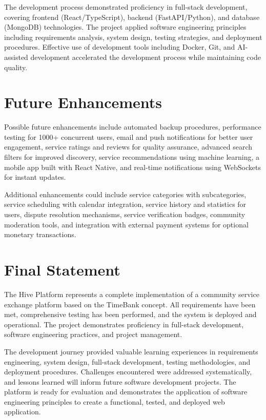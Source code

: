 \documentclass[12pt,a4paper]{report}
\begin{document}
The development process demonstrated proficiency in full-stack development, covering frontend (React/TypeScript), backend (FastAPI/Python), and database (MongoDB) technologies. The project applied software engineering principles including requirements analysis, system design, testing strategies, and deployment procedures. Effective use of development tools including Docker, Git, and AI-assisted development accelerated the development process while maintaining code quality.

\section{Future Enhancements}

Possible future enhancements include automated backup procedures, performance testing for 1000+ concurrent users, email and push notifications for better user engagement, service ratings and reviews for quality assurance, advanced search filters for improved discovery, service recommendations using machine learning, a mobile app built with React Native, and real-time notifications using WebSockets for instant updates.

Additional enhancements could include service categories with subcategories, service scheduling with calendar integration, service history and statistics for users, dispute resolution mechanisms, service verification badges, community moderation tools, and integration with external payment systems for optional monetary transactions.

\section{Final Statement}

The Hive Platform represents a complete implementation of a community service exchange platform based on the TimeBank concept. All requirements have been met, comprehensive testing has been performed, and the system is deployed and operational. The project demonstrates proficiency in full-stack development, software engineering practices, and project management.

The development journey provided valuable learning experiences in requirements engineering, system design, full-stack development, testing methodologies, and deployment procedures. Challenges encountered were addressed systematically, and lessons learned will inform future software development projects. The platform is ready for evaluation and demonstrates the application of software engineering principles to create a functional, tested, and deployed web application.
\end{document}
